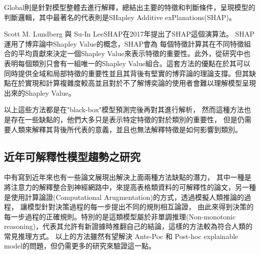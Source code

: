 \documentclass[class=NCU_thesis, crop=false]{standalone}
\begin{document}
Global則是針對模型整體去進行解釋，總結出主要的特徵和判斷條件，呈現模型的判斷邏輯，其中最著名的代表則是SHapley Additive exPlanations(SHAP)\cite{NIPS2017_8a20a862}。

Scott M. Lundberg 與 Su-In LeeSHAP在2017年提出了SHAP這個演算法\cite{NIPS2017_8a20a862}。 SHAP運用了博弈論中Shapley Value的概念，SHAP會為
每個特徵計算其在不同特徵組合的平均貢獻來決定一個Shapley Value來表示特徵的重要性。此外，從研究中也表明每個類別只會有一組唯一的Shapley Value組合。這套方法的優點在於其可以同時提供全域和局部特徵的重要性並且其背後有堅實的博弈論的理論支撐。但其缺點在於實現和計算複雜度較高並且對於不了解博奕論的使用者會難以理解模型呈現出來的Shapley Value。

以上這些方法都是在"black-box"模型預測完後再對其進行解析，
然而這種方法也是存在一些缺點的，他們大多只是表示特定特徵的對於類別的重要性，
但是仍需要人類來解釋其背後所代表的意義，並且也無法解釋特徵是如何影響到類別。

\subsection{近年可解釋性模型趨勢之研究}
\cite{LONGO2024102301}中有寫到近年來也有一些論文展現出解決上面兩種方法缺點的潛力，
其中一種是將注意力的解釋整合到神經網路中，來提高表格類資料的可解釋性的論文\cite{Arik_Pfister_2021}，另一種是使用計算論證(Computational Arugmentation)的方式\cite{ijcai2021p600}，透過模擬人類推論的過程，
讓模型針對決策過程的每一步提出不同的規則相互論證，
由此來得到決策的每一步過程的正確規則。特別的是這類模型屬於非單調推理(Non-monotonic reasoning)，代表其允許有新證據時推翻自己的結論，這樣的方法較為符合人類的常見推理方式。
以上的方法雖然有望解決 Ante-Poc 和 Post-hoc explainable model的問題，但仍需更多的研究來驗證這一點。
\end{document}

